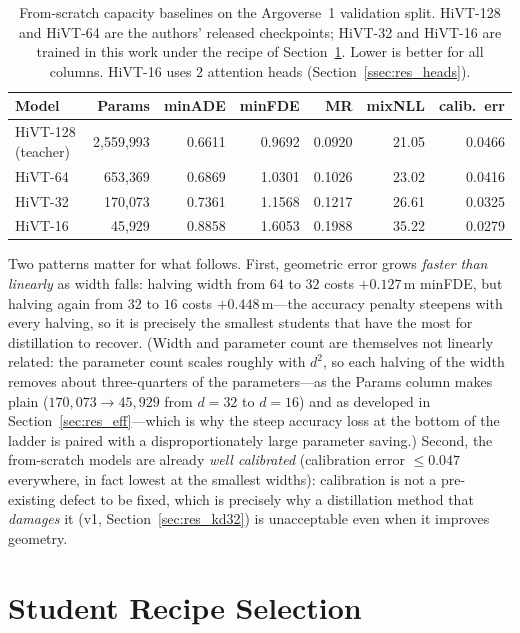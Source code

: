 \begin{table}[htbp]
  \centering
  \caption{From-scratch capacity baselines on the Argoverse~1 validation split.
    HiVT-128 and HiVT-64 are the authors' released checkpoints; HiVT-32 and
    HiVT-16 are trained in this work under the recipe of
    Section~\ref{sec:res_recipe}. Lower is better for all columns. HiVT-16 uses
    $2$ attention heads (Section~\ref{ssec:res_heads}).}
  \label{tab:baselines}
  \begin{tabular}{lrrrrrr}
    \toprule
    Model & Params & minADE & minFDE & MR & mixNLL & calib.\ err \\
    \midrule
    HiVT-128 (teacher) & 2{,}559{,}993 & 0.6611 & 0.9692 & 0.0920 & 21.05 & 0.0466 \\
    HiVT-64            & 653{,}369    & 0.6869 & 1.0301 & 0.1026 & 23.02 & 0.0416 \\
    HiVT-32            & 170{,}073    & 0.7361 & 1.1568 & 0.1217 & 26.61 & 0.0325 \\
    HiVT-16            & 45{,}929     & 0.8858 & 1.6053 & 0.1988 & 35.22 & 0.0279 \\
    \bottomrule
  \end{tabular}
\end{table}

Two patterns matter for what follows. First, geometric error grows
\emph{faster than linearly} as width falls: halving width from $64$ to $32$ costs
$+0.127$\,m minFDE, but halving again from $32$ to $16$ costs $+0.448$\,m---the
accuracy penalty steepens with every halving, so it is precisely the smallest
students that have the most for distillation to recover. (Width and parameter count
are themselves not linearly related: the parameter count scales roughly with $d^2$,
so each halving of the width removes about three-quarters of the parameters---as the
Params column makes plain ($170{,}073\!\to\!45{,}929$ from $d{=}32$ to $d{=}16$) and
as developed in Section~\ref{sec:res_eff}---which is why the steep accuracy loss at
the bottom of the ladder is paired with a disproportionately large parameter saving.)
Second, the from-scratch models are already
\emph{well calibrated} (calibration error $\le 0.047$ everywhere, in fact lowest at
the smallest widths): calibration is not a pre-existing defect to be fixed, which
is precisely why a distillation method that \emph{damages} it (v1,
Section~\ref{sec:res_kd32}) is unacceptable even when it improves geometry.

\section{Student Recipe Selection}
\label{sec:res_recipe}

